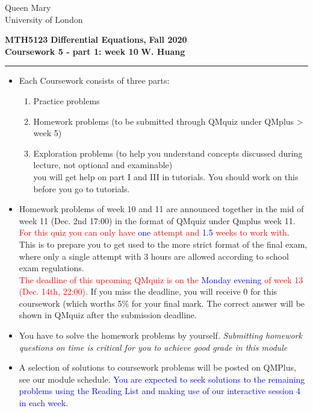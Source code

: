 \documentclass[11pt,a4paper,twoside]{article}
\begin{document}
	\begin{singlespace}
		\begin{center}
			\Huge Queen Mary\\
			\LARGE University of London
		\end{center}
		\Large \textbf{MTH5123} \hfill \Large \textbf{Differential Equations,} \hfill \Large \textbf{Fall 2020}\\
		\large \textbf{Coursework 5 - part 1: week 10} \hfill \large \textbf{W. Huang}
		\rule{\textwidth}{0.4pt}
	\end{singlespace}
	\begin{itemize}
		\item Each Coursework consists of three parts:
		\begin{enumerate}[\bfseries I.]
			\item Practice problems
			\item Homework problems (to be submitted through QMquiz under QMplus > week 5)
			\item Exploration problems (to help you understand concepts discussed during lecture, not optional and examinable)\\
			you will get help on part I and III in tutorials. You should work on this before you go to tutorials.
		\end{enumerate}
		\item Homework problems of week 10 and 11 are announced together in the mid of week 11 (Dec. 2nd 17:00) in the format of QMquiz under Qmplus week 11. \textcolor{red}{For this quiz you can only have} \textcolor{blue}{one} \textcolor{red}{attempt and} \textcolor{blue}{1.5} \textcolor{red}{weeks to work with}. This is to prepare you to get used to the more strict format of the final exam, where only a single attempt with 3 hours are allowed according to school exam regulations.\\
		\textcolor{red}{The deadline of this upcoming QMquiz is on the} \textcolor{blue}{Monday evening} \textcolor{red}{of week 13 (Dec. 14th, 22:00)}. If you miss the deadline, you will receive 0 for this coursework (which worths 5\% for your final mark. The correct answer will be shown in QMquiz after the submission deadline.
		\item You have to solve the homework problems by yourself. \textit{Submitting homework questions on time is critical for you to achieve good grade in this module}
		\item A selection of solutions to coursework problems will be posted on QMPlus, see our
		module schedule. \textcolor{blue}{You are expected to seek solutions to the remaining problems using the Reading List and making use of our interactive session 4 in each week.}

\end{itemize}
\end{document}
